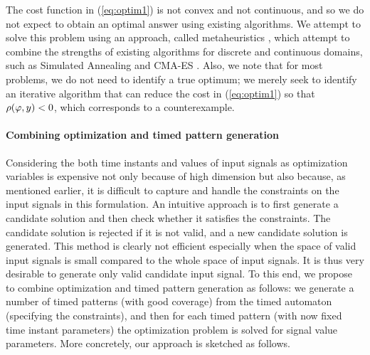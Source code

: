 The cost function in (\ref{eq:optim1}) is not convex and not continuous, and so we do not expect to obtain an optimal answer using existing algorithms. We attempt to solve this problem using an approach, called metaheuristics \cite{dreo:hal-01341683}, which attempt to combine the strengths of existing algorithms for discrete and continuous domains, such as Simulated Annealing \cite{Kirkpatrick83optimizationby} and CMA-ES \cite{hansen2006eda}. Also, we note that for most problems, we do not need to identify a true optimum; we merely seek to identify an iterative algorithm that can reduce the cost in (\ref{eq:optim1}) so that $\rho(\varphi,y)<0$, which corresponds to a counterexample.


\paragraph{Combining optimization and timed pattern generation} Considering the both time instants and values of input signals as optimization variables is expensive not only because of high dimension but also because, as mentioned earlier, it is difficult to capture and handle the constraints on the input signals in this formulation. An intuitive approach is to first generate a candidate solution and then check whether it satisfies the constraints. The candidate solution is rejected if it is not valid, and a new candidate solution is generated. This method is clearly not efficient especially when the space of valid input signals is small compared to the whole space of input signals. It is thus very desirable to generate only valid candidate input signal. To this end, we propose to combine optimization and timed pattern generation as follows: we generate a number of timed patterns (with good coverage) from the timed automaton (specifying the constraints), and then for each timed pattern (with now fixed time instant parameters) the optimization problem is solved for signal value parameters. More concretely, our approach is sketched as follows.


